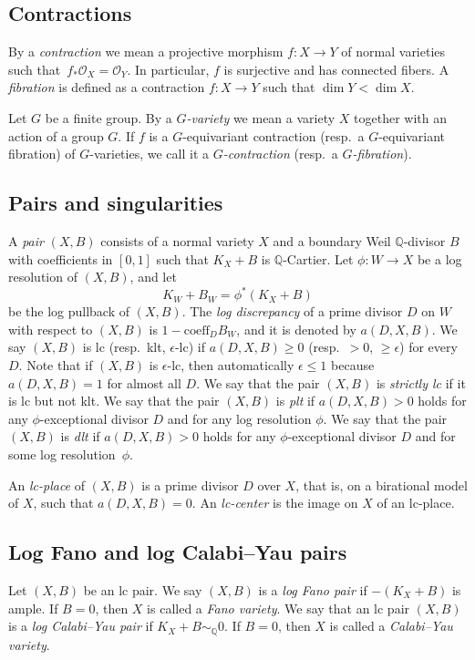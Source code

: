 \documentclass[11pt]{amsart}
\numberwithin{equation}{section}
\theoremstyle{definition}
\theoremstyle{remark}
\newcommand{\OOO}{\mathscr{O}}
\begin{document}
\subsection{Contractions} By a \emph{contraction} we mean a projective
morphism $f\colon X \to Y$ of normal varieties such that~$f_*\OOO_X =
\OOO_Y$. In particular, $f$ is surjective and has connected fibers. A
\emph{fibration} is defined as a contraction $f\colon X\to Y$ such
that $\dim Y<\dim X$.

Let $G$ be a finite group. By a \emph{$G$-variety} we mean a variety
$X$ together with an action of a group $G$. If $f$ is a
$G$-equivariant contraction (resp.\ a $G$-equivariant fibration) of
$G$-varieties, we call it a \emph{$G$-contraction} (resp.\ a
\emph{$G$-fibration}).

\subsection{Pairs and singularities} 
\label{subsec-pairs-sing}
A \emph{pair} $(X, B)$ consists of a normal variety $X$ and a boundary Weil $\mathbb{Q}$-divisor $B$ with coefficients in $[0, 1]$ such that $K_X + B$ is $\mathbb{Q}$-Cartier.  Let $\phi\colon W \to X$ be a log resolution of $(X,B)$, and let
\[
K_W +B_W = \phi^*(K_X +B)
\]
be the log pullback of $(X, B)$.  The \emph{log discrepancy} of a prime divisor $D$ on $W$ with respect to $(X, B)$ is $1 - \mathrm{coeff}_D B_W$, and it is denoted by $a(D, X, B)$. We say $(X, B)$ is lc (resp.\ klt, $\epsilon$-lc) if $a(D, X, B)\geq 0$ (resp.\ $> 0$, $\geq \epsilon$) for every $D$. Note that if $(X, B)$ is $\epsilon$-lc, then automatically $\epsilon \leq 1$ because $a(D, X, B) = 1$ for almost all $D$. We say that the pair $(X, B)$ is \emph{strictly lc} if it is lc but not klt.  We say that the pair $(X,B)$ is \emph{plt} if $a(D, X, B)>0$ holds for any $\phi$-exceptional divisor $D$ and for any log resolution $\phi$.  We say that the pair $(X,B)$ is \emph{dlt} if $a(D, X, B)>0$ holds for any $\phi$-exceptional divisor $D$ and for some log resolution~$\phi$.

An \emph{lc-place} of $(X, B)$ is a prime divisor $D$ over $X$, that
is, on a birational model of $X$, such that $a(D, X, B) = 0$. An
\emph{lc-center} is the image on $X$ of an lc-place.

\subsection{Log Fano and log Calabi--Yau pairs}
\label{sect-log-CY}
Let $(X, B)$ be an lc pair. We say $(X,B)$ is a \emph{log Fano pair} if $-(K_X+B)$ is ample.  If $B=0$, then $X$ is called a \emph{Fano variety}.  We say that an lc pair $(X,B)$ is a \emph{log Calabi--Yau pair} if $K_X + B \sim_{\mathbb{Q}} 0$. If $B=0$, then $X$ is called a \emph{Calabi--Yau variety}.
\end{document}

